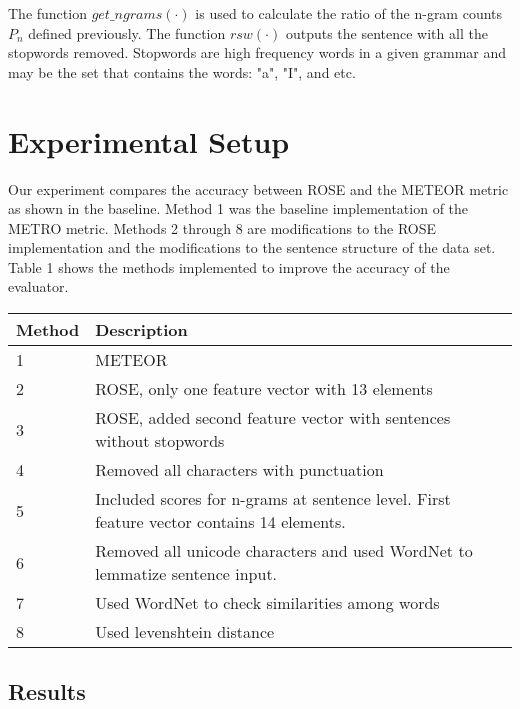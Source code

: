 \documentclass[11pt,letterpaper]{article}
\begin{document}
The function $get\_ngrams(\cdot)$ is used to calculate the ratio of the n-gram counts $P_{n}$ defined previously. The function $rsw(\cdot)$ outputs the sentence with all the stopwords removed. Stopwords are high frequency words in a given grammar and may be the set that contains the words: "a", "I", and etc.
\section{Experimental Setup}

Our experiment compares the accuracy between ROSE and the METEOR metric as shown in the baseline. Method 1 was the baseline implementation of the METRO metric. Methods 2 through 8 are modifications to the ROSE implementation  \cite{song2011regression} and the modifications to the sentence structure of the data set. 
Table 1 shows the methods implemented to improve the accuracy of the evaluator.
\begin{center}
	\begin{tabular}{| l | p{7cm} |}
	\hline
	Method & Description \\ \hline
	1 & METEOR \\ \hline
	2 & ROSE, only one feature vector with 13 elements \\ \hline
	3 & ROSE, added second feature vector with sentences without stopwords \\ \hline
	4 & Removed all characters with punctuation \\ \hline
	5 & Included scores for n-grams at sentence level. First feature vector contains 14 elements.  \\ \hline
	6 & Removed all unicode characters and used WordNet to lemmatize sentence input. \\ \hline
	7 & Used WordNet to check similarities among words \\ \hline
	8 & Used levenshtein distance \\ \hline
	\end{tabular}
\end{center}
	

\subsection{Results}
\end{document}
